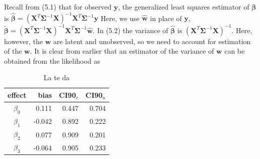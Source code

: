 \documentclass[12pt, titlepage]{article}
\begin{document}
Recall from (5.1) that for observed $\mathbf{y}$, the generalized least squares estimator of $\boldsymbol{\beta}$ is $\hat{\boldsymbol{\beta}} = (\mathbf{X}^{T}\boldsymbol{\Sigma}^{-1}\mathbf{X})^{-1}\mathbf{X}^{T}\boldsymbol{\Sigma}^{-1}\mathbf{y}$  Here, we use $\hat{\mathbf{w}}$ in place of $\mathbf{y}$, $\tilde{\boldsymbol{\beta}} = (\mathbf{X}^{T}\boldsymbol{\Sigma}^{-1}\mathbf{X})^{-1}\mathbf{X}^{T}\boldsymbol{\Sigma}^{-1}\hat{\mathbf{w}}$.  In (5.2) the variance of $\hat{\boldsymbol{\beta}}$ is $(\mathbf{X}^{T}\boldsymbol{\Sigma}^{-1}\mathbf{X})^{-1}$.  Here, however, the $\mathbf{w}$ are latent and unobserved, so we need to account for estimation of the $\mathbf{w}$.  It is clear from earlier that an estimator of the variance of $\mathbf{w}$ can be obtained from the likelihood as


\begin{table}[H] 
	\caption{La te da  \label{tab:sglm_fe}}
\begin{center}
\begin{tabular}{|c|rrr|}
\hline
\hline
effect & bias & CI90$_{c}$ & CI90$_{u}$ \\
\hline
$\beta_{0}$ & 0.111 & 0.447 & 0.704 \\ 
$\beta_{1}$ & -0.042 & 0.892 & 0.222 \\ 
$\beta_{2}$ & 0.077 & 0.909 & 0.201 \\ 
$\beta_{3}$ & -0.064 & 0.905 & 0.233 \\ 
\hline
\hline
\end{tabular}
\end{center}
\end{table}



%


%
%
\end{document}
